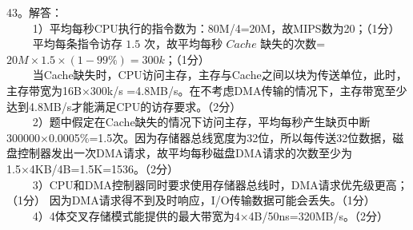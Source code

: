 43。解答：\\
$\qquad$ 1）平均每秒CPU执行的指令数为：80M/4=20M，故MIPS数为20；（1分） \\
$\qquad$ 平均每条指令访存 $1.5$ 次，故平均每秒 $Cache$ 缺失的次数=$20M \times 1.5 \times (1-99\%)=300k$；（1分） \\
$\qquad$ 当Cache缺失时，CPU访问主存，主存与Cache之间以块为传送单位，此时，主存带宽为16B×300k/s =4.8MB/s。在不考虑DMA传输的情况下，主存带宽至少达到4.8MB/s才能满足CPU的访存要求。（2分） \\
$\qquad$ 2）题中假定在Cache缺失的情况下访问主存，平均每秒产生缺页中断300000×0.0005\%=1.5次。因为存储器总线宽度为32位，所以每传送32位数据，磁盘控制器发出一次DMA请求，故平均每秒磁盘DMA请求的次数至少为1.5×4KB/4B=1.5K=1536。（2分） \\
$\qquad$ 3）CPU和DMA控制器同时要求使用存储器总线时，DMA请求优先级更高；（1分） 因为DMA请求得不到及时响应，I/O传输数据可能会丢失。（1分） \\
$\qquad$ 4）4体交叉存储模式能提供的最大带宽为4×4B/50ns=320MB/s。（2分）

